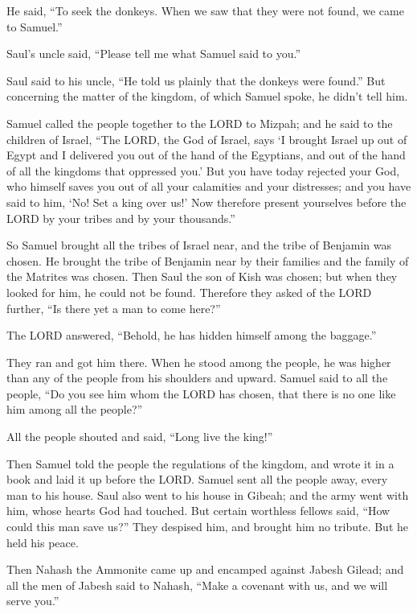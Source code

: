 He said, “To seek the donkeys. When we saw that they were not found, we came to Samuel.”

\myverse{}Saul’s uncle said, “Please tell me what Samuel said to you.”

\myverse{}Saul said to his uncle, “He told us plainly that the donkeys
were found.” But concerning the matter of the kingdom, of which Samuel spoke, he didn’t tell him.

\myverse{}Samuel called the people together to the LORD to Mizpah;
\myverse{}and he said to the children of Israel, “The LORD, the God of Israel, says
‘I brought Israel up out of Egypt and I delivered you out of the hand of the Egyptians, and out of the
hand of all the kingdoms that oppressed you.’
\myverse{}But you have today rejected your God, who himself saves you out of all your
calamities and your distresses; and you have said to him, ‘No! Set a king over us!’ Now therefore present
yourselves before the LORD by your tribes and by your thousands.”

\myverse{}So Samuel brought all the tribes of Israel near, and the tribe
of Benjamin was chosen.
\myverse{}He brought the tribe of Benjamin near by their families and the family of
the Matrites was chosen. Then Saul the son of Kish was chosen; but when they looked for him, he could
not be found.
\myverse{}Therefore they asked of the LORD further, “Is there yet a man to come here?”

The LORD answered, “Behold, he has hidden himself among the baggage.”

\myverse{}They ran and got him there. When he stood among the people,
he was higher than any of the people from his shoulders and upward.
\myverse{}Samuel said to all the people, “Do you see him whom the LORD has chosen,
that there is no one like him among all the people?”

All the people shouted and said, “Long live the king!”

\myverse{}Then Samuel told the people the regulations of the kingdom,
and wrote it in a book and laid it up before the LORD. Samuel sent all the people away, every man to his
house.
\myverse{}Saul also went to his house in Gibeah; and the army went with him, whose
hearts God had touched.
\myverse{}But certain worthless fellows said, “How could this man save us?” They despised
him, and brought him no tribute. But he held his peace.


\mychapter{} \myverse*{}Then Nahash the Ammonite came up and encamped against Jabesh Gilead;
and all the men of Jabesh said to Nahash, “Make a covenant with us, and we will serve you.”

